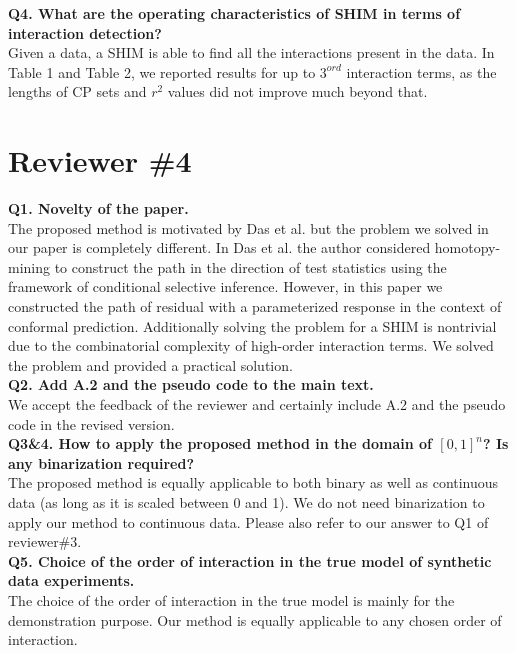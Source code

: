 \documentclass{article}
\begin{document}
\textbf{Q4. What are the operating characteristics of SHIM in terms of interaction detection?}\\

Given a data, a SHIM is able to find all the interactions present in the data. In Table 1 and Table 2, we reported results for up to $3^{ord}$ interaction terms, as the lengths of CP sets and $r^2$ values did not improve much beyond that.


\section*{Reviewer \#4}
\textbf{Q1. Novelty of the paper.}\\

The proposed method is motivated by Das et al. but the problem we solved in our paper is completely different. In Das et al. the author considered homotopy-mining to construct the path in the direction of test statistics using the framework of conditional selective inference. However, in this paper we constructed the path of residual with a parameterized response in the context of conformal prediction. Additionally solving the problem for a SHIM is nontrivial due to the combinatorial complexity of high-order interaction terms. We solved the problem and provided a practical solution.\\

\textbf{Q2. Add A.2 and the pseudo code to the main text.}\\

We accept the feedback of the reviewer and certainly include A.2 and the pseudo code in the revised version.\\

\textbf{Q3\&4. How to apply the proposed method in the domain of $[0, 1]^n$? Is any binarization required?}\\

The proposed method is equally applicable to both binary as well as continuous data (as long as it is scaled between 0 and 1). We do not need binarization to apply our method to continuous data. Please also refer to our answer to Q1 of reviewer\#3. \\

\textbf{Q5. Choice of the order of interaction in the true model of synthetic data experiments.}\\

The choice of the order of interaction in the true model is mainly for the demonstration purpose. Our method is equally applicable to any chosen order of interaction.\\
\end{document}
